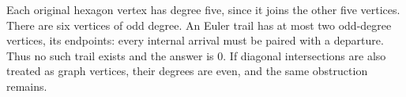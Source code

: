 Each original hexagon vertex has degree five, since it joins the other five vertices. There are six vertices of odd degree. An Euler trail has at most two odd-degree vertices, its endpoints: every internal arrival must be paired with a departure. Thus no such trail exists and the answer is $\boxed0$. If diagonal intersections are also treated as graph vertices, their degrees are even, and the same obstruction remains.

